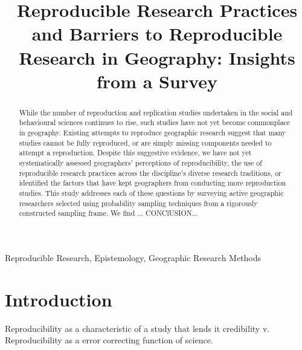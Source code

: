 \documentclass[]{interact}
\theoremstyle{plain}%
\theoremstyle{definition}
\theoremstyle{remark}
\begin{document}

\title{Reproducible Research Practices and Barriers to Reproducible Research in Geography: Insights from a Survey}

\author{
}

\maketitle

\begin{abstract}
While the number of reproduction and replication studies undertaken in the social and behavioural sciences continues to rise, such studies have not yet become commonplace in geography. 
Existing attempts to reproduce geographic research suggest that many studies cannot be fully reproduced, or are simply missing components needed to attempt a reproduction. 
Despite this suggestive evidence, we have not yet systematically assessed geographers' perceptions of reproducibility, the use of reproducible research practices across the discipline's diverse research traditions, or identified the factors that have kept geographers from conducting more reproduction studies.
This study addresses each of these questions by surveying active geographic researchers selected using probability sampling techniques from a rigorously constructed sampling frame.
We find ...
CONClUSION...

\end{abstract}

\begin{keywords}
Reproducible Research, Epistemology, Geographic Research Methods
\end{keywords}

\section*{Introduction}
Reproducibility as a characteristic of a study that lends it credibility v. Reproducibility as a error correcting function of science. 
\end{document}
